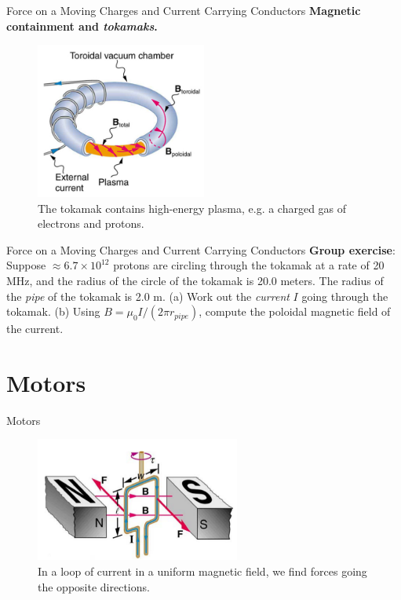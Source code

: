 \documentclass{beamer}
\begin{document}
\begin{frame}{Force on a Moving Charges and Current Carrying Conductors}
\textbf{Magnetic containment and \textit{tokamaks}.}
\begin{figure}
\centering
\includegraphics[width=0.5\textwidth]{figures/tokamak.png}
\caption{\label{fig:tokamak} The tokamak contains high-energy plasma, e.g. a charged gas of electrons and protons.}
\end{figure}
\end{frame}

\begin{frame}{Force on a Moving Charges and Current Carrying Conductors}
\textbf{Group exercise}: Suppose $\approx 6.7 \times 10^{12}$ protons are circling through the tokamak at a rate of 20 MHz, and the radius of the circle of the tokamak is 20.0 meters.  The radius of the \textit{pipe} of the tokamak is 2.0 m. (a) Work out the \textit{current} $I$ going through the tokamak.  (b) Using $B = \mu_0 I / (2\pi r_{pipe})$, compute the poloidal magnetic field of the current.
\end{frame}

\section{Motors}

\begin{frame}{Motors} 
\begin{figure}
\centering
\includegraphics[width=0.6\textwidth]{figures/loop.png}
\caption{\label{fig:loop} In a loop of current in a uniform magnetic field, we find forces going the opposite directions.}
\end{figure}
\end{frame}
\end{document}
